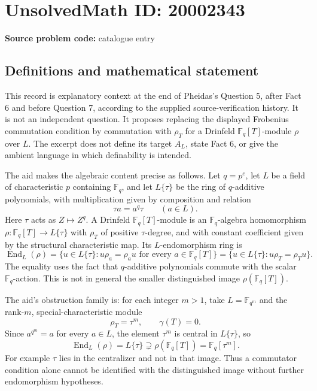 \documentclass[11pt]{article}
\newcommand{\F}{\mathbb{F}}
\begin{document}
\section*{UnsolvedMath ID: 20002343}
\textbf{Source problem code:} catalogue entry
\subsection{Definitions and mathematical statement}
This record is explanatory context at the end of Pheidas's Question 5, after Fact 6 and before Question 7, according to the supplied source-verification history. It is not an independent question. It proposes replacing the displayed Frobenius commutation condition by commutation with \(\rho_T\) for a Drinfeld \(\F_q[T]\)-module \(\rho\) over \(L\). The excerpt does not define its target \(A_L\), state Fact 6, or give the ambient language in which definability is intended.

The aid makes the algebraic content precise as follows. Let \(q=p^e\), let \(L\) be a field of characteristic \(p\) containing \(\F_q\), and let \(L\{\tau\}\) be the ring of \(q\)-additive polynomials, with multiplication given by composition and relation
\[
 \tau a=a^q\tau\qquad(a\in L).
\]
Here \(\tau\) acts as \(Z\mapsto Z^q\). A Drinfeld \(\F_q[T]\)-module is an \(\F_q\)-algebra homomorphism \(\rho:\F_q[T]\to L\{\tau\}\) with \(\rho_T\) of positive \(\tau\)-degree, and with constant coefficient given by the structural characteristic map. Its \(L\)-endomorphism ring is
\[
 \operatorname{End}_L(\rho)
 =\{u\in L\{\tau\}:u\rho_a=\rho_a u\text{ for every }a\in\F_q[T]\}
 =\{u\in L\{\tau\}:u\rho_T=\rho_Tu\}.
\]
The equality uses the fact that \(q\)-additive polynomials commute with the scalar \(\F_q\)-action. This is not in general the smaller distinguished image \(\rho(\F_q[T])\).

The aid's obstruction family is: for each integer \(m>1\), take \(L=\F_{q^m}\) and the rank-\(m\), special-characteristic module
\[
 \rho_T=\tau^m,\qquad \gamma(T)=0.
\]
Since \(a^{q^m}=a\) for every \(a\in L\), the element \(\tau^m\) is central in \(L\{\tau\}\), so
\[
 \operatorname{End}_L(\rho)=L\{\tau\}
 \supsetneq\rho(\F_q[T])=\F_q[\tau^m].
\]
For example \(\tau\) lies in the centralizer and not in that image. Thus a commutator condition alone cannot be identified with the distinguished image without further endomorphism hypotheses.
\end{document}
